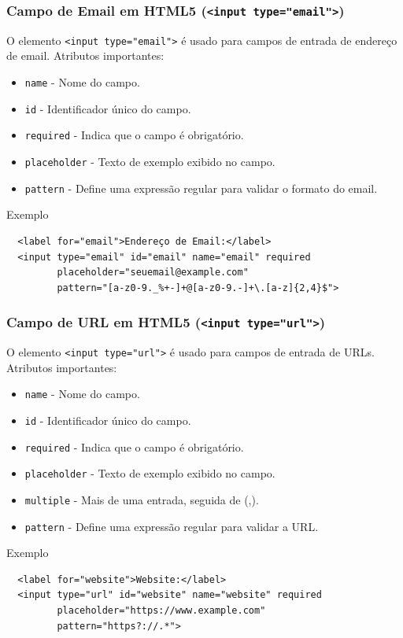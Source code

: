 \documentclass{beamer}
\begin{document}
\begin{frame}[fragile]
  \frametitle{Campo de Email em HTML5 (\texttt{<input type="email"}\texttt{>})}

  O elemento \texttt{<input type="email"}\texttt{>} é usado para campos de entrada de endereço de email. Atributos importantes:

  \begin{itemize}
    \item \texttt{name} - Nome do campo.
    \item \texttt{id} - Identificador único do campo.
    \item \texttt{required} - Indica que o campo é obrigatório.
    \item \texttt{placeholder} - Texto de exemplo exibido no campo.
    \item \texttt{pattern} - Define uma expressão regular para validar o formato do email.
  \end{itemize}

\begin{block}{Exemplo}
  \begin{verbatim}
  <label for="email">Endereço de Email:</label>
  <input type="email" id="email" name="email" required
         placeholder="seuemail@example.com"
         pattern="[a-z0-9._%+-]+@[a-z0-9.-]+\.[a-z]{2,4}$">
  \end{verbatim}
\end{block}
\end{frame}

\begin{frame}[fragile]
  \frametitle{Campo de URL em HTML5 (\texttt{<input type="url"}\texttt{>})}

  O elemento \texttt{<input type="url"}\texttt{>} é usado para campos de entrada de URLs. Atributos importantes:

  \begin{itemize}
    \item \texttt{name} - Nome do campo.
    \item \texttt{id} - Identificador único do campo.
    \item \texttt{required} - Indica que o campo é obrigatório.
    \item \texttt{placeholder} - Texto de exemplo exibido no campo.
    \item \texttt{multiple} - Mais de uma entrada, seguida de (,).
    \item \texttt{pattern} - Define uma expressão regular para validar a URL.
  \end{itemize}
  
\begin{block}{Exemplo}
  \begin{verbatim}
  <label for="website">Website:</label>
  <input type="url" id="website" name="website" required
         placeholder="https://www.example.com"
         pattern="https?://.*">
  \end{verbatim}    
\end{block}

\end{frame}
\end{document}
